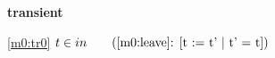 \textbf{transient}
\begin{block}
\item[ \eqref{m0:tr0} ]$t \in in  \qquad \text{(\ref{m0:leave}: [t := t' | t' = t])}$ %
\end{block}
